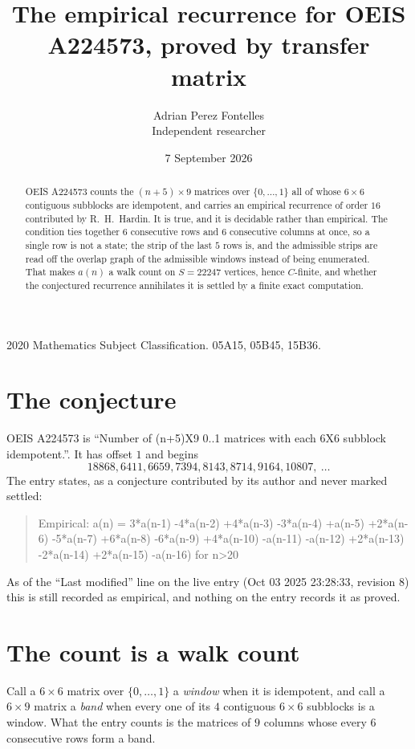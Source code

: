 \documentclass[11pt,a4paper]{article}
\title{The empirical recurrence for OEIS A224573, proved by transfer matrix}
\author{Adrian Perez Fontelles\\ \small Independent researcher}
\date{7 September 2026}
\theoremstyle{plain}
\theoremstyle{definition}
\begin{document}
\maketitle

\begin{abstract}
OEIS A224573 counts the $(n+5)\times9$ matrices over $\{0,\dots,1\}$ all of whose
$6\times6$ contiguous subblocks are idempotent, and carries an empirical recurrence of order
$16$ contributed by R.~H.~Hardin. It is true, and it is decidable rather than empirical.
The condition ties together $6$ consecutive rows and $6$ consecutive columns at once, so a
single row is not a state; the strip of the last $5$ rows is, and the admissible strips
are read off the overlap graph of the admissible windows instead of being enumerated. That
makes $a(n)$ a walk count on $S=22247$ vertices, hence $C$-finite, and whether the conjectured
recurrence annihilates it is settled by a finite exact computation.
\end{abstract}

\noindent\small 2020 Mathematics Subject Classification. 05A15, 05B45, 15B36.\normalsize

\section{The conjecture}

OEIS A224573 is ``Number of (n+5)X9 0..1 matrices with each 6X6 subblock idempotent.''. It has offset $1$ and begins
\[
18868, 6411, 6659, 7394, 8143, 8714, 9164, 10807,\ \dots
\]
The entry states, as a conjecture contributed by its author and never marked settled:
\begin{quote}
Empirical: a(n) = 3*a(n-1) -4*a(n-2) +4*a(n-3) -3*a(n-4) +a(n-5) +2*a(n-6) -5*a(n-7) +6*a(n-8) -6*a(n-9) +4*a(n-10) -a(n-11) -a(n-12) +2*a(n-13) -2*a(n-14) +2*a(n-15) -a(n-16) for n>20
\end{quote}
As of the ``Last modified'' line on the live entry (Oct 03 2025 23:28:33, revision 8) this is still
recorded as empirical, and nothing on the entry records it as proved.

\section{The count is a walk count}

Call a $6\times6$ matrix over $\{0,\dots,1\}$ a \emph{window} when it is idempotent, and
call a $6\times9$ matrix a \emph{band} when every one of its $4$ contiguous
$6\times6$ subblocks is a window. What the entry counts is the matrices of $9$ columns
whose every $6$ consecutive rows form a band.
\end{document}
